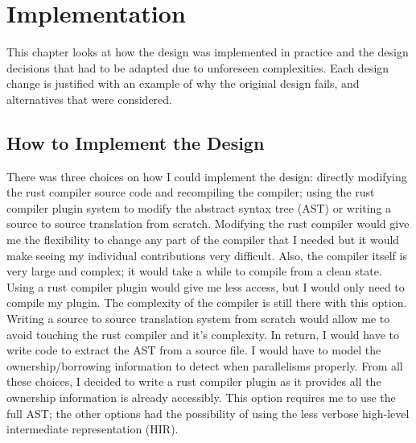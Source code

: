 \chapter{Implementation}
\label{chapter:Implementation}

This chapter looks at how the design was implemented in practice and the design decisions that had to be adapted due to unforeseen complexities. Each design change is justified with an example of why the original design fails, and alternatives that were considered.

\section{How to Implement the Design}
There was three choices on how I could implement the design: directly modifying the rust compiler source code and recompiling the compiler; using the rust compiler plugin system to modify the abstract syntax tree (AST) or writing a source to source translation from scratch. Modifying the rust compiler would give me the flexibility to change any part of the compiler that I needed but it would make seeing my individual contributions very difficult. Also, the compiler itself is very large and complex; it would take a while to compile from a clean state. Using a rust compiler plugin would give me less access, but I would only need to compile my plugin. The complexity of the compiler is still there with this option. Writing a source to source translation system from scratch would allow me to avoid touching the rust compiler and it's complexity. In return, I would have to write code to extract the AST from a source file. I would have to model the ownership/borrowing information to detect when parallelisms properly. From all these choices, I decided to write a rust compiler plugin as it provides all the ownership information is already accessibly. This option requires me to use the full AST; the other options had the possibility of using the less verbose high-level intermediate representation (HIR).

